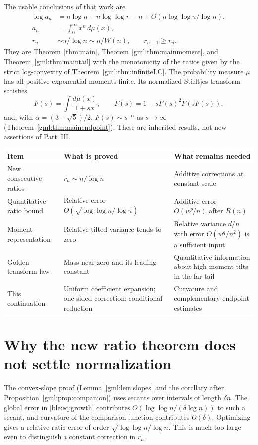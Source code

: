 \documentclass[11pt]{article}
\numberwithin{equation}{section}
\theoremstyle{definition}
\theoremstyle{remark}
\begin{document}
The usable conclusions of that work are
\begin{align}
 \log a_n&=n\log n-n\log\log n-n+O(n\log\log n/\log n),\label{ble:eq:growth}\\
 a_n&=\int_0^\infty x^n\,d\mu(x),\label{ble:eq:moment}\\
 r_n&\sim n/\log n\sim n/W(n),\qquad r_{n+1}\ge r_n.\label{ble:eq:ratio}
\end{align}
They are Theorem~\ref{thm:main}, Theorem~\ref{gml:thm:mainmoment}, and
Theorem~\ref{gml:thm:maintail} with the monotonicity of the ratios given by
the strict log-convexity of Theorem~\ref{gml:thm:infiniteLC}.
The probability measure $\mu$ has all positive exponential moments finite.
Its normalized Stieltjes transform satisfies
\[
 F(s)=\int\frac{d\mu(x)}{1+sx},\qquad
 F(s)=1-sF(s)^2F(sF(s)),
\]
and, with $\alpha=(3-\sqrt5)/2$, $F(s)\sim s^{-\alpha}$ as $s\to\infty$
(Theorem~\ref{gml:thm:mainendpoint}). These are inherited results, not new
assertions of Part~III.

\begin{center}\small
\begin{tabular}{>{\raggedright\arraybackslash}p{.28\linewidth}>{\raggedright\arraybackslash}p{.31\linewidth}>{\raggedright\arraybackslash}p{.31\linewidth}}\toprule
Item & What is proved & What remains needed\\\midrule
New consecutive ratios & $r_n\sim n/\log n$ & Additive corrections at constant scale\\
Quantitative ratio bound & Relative error $O(\sqrt{\log\log n/\log n})$ & Additive error $O(w^p/n)$ after $R(n)$\\
Moment representation & Relative tilted variance tends to zero & Relative variance $d/n$ with error $O(w^q/n^2)$ is a sufficient input\\
Golden transform law & Mass near zero and its leading constant & Quantitative information about high-moment tilts in the far tail\\
This continuation & Uniform coefficient expansion; one-sided correction; conditional reduction & Curvature and complementary-endpoint estimates\\\bottomrule
\end{tabular}\end{center}

\section{Why the new ratio theorem does not settle normalization}\label{ble:sec:why}
The convex-slope proof (Lemma~\ref{gml:lem:slopes} and the corollary after
Proposition~\ref{gml:prop:companion}) uses secants over intervals of length
$\delta n$. The global error in \eqref{ble:eq:growth} contributes
$O(\log\log n/(\delta\log n))$ to such a secant, and curvature of the
comparison function contributes $O(\delta)$. Optimizing gives a relative
ratio error of order $\sqrt{\log\log n/\log n}$. This is much too large even
to distinguish a constant correction in $r_n$.
\end{document}
